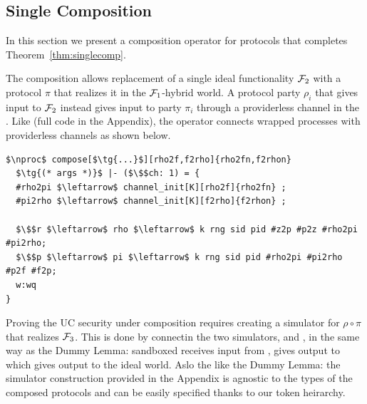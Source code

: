\subsection{Single Composition}
In this section we present a composition operator for protocols that completes Theorem~\ref{thm:singlecomp}.

The composition allows replacement of a single ideal functionality $\mathcal{F}_2$ with a protocol $\pi$ that realizes it in the $\mathcal{F}_1$-hybrid world. 
A protocol party $\rho_i$ that gives input to $\mathcal{F}_2$ instead gives input to party $\pi_i$ through a providerless channel in the \partywrapper. 
Like  (full code in the Appendix), the operator connects wrapped processes with providerless channels as shown below. 
\begin{lstlisting}[basicstyle=\footnotesize\BeraMonottFamily, mathescape, frame=single]
$\nproc$ compose[$\tg{...}$][rho2f,f2rho]{rho2fn,f2rhon}
  $\tg{(* args *)}$ |- ($\$$ch: 1) = {
  #rho2pi $\leftarrow$ channel_init[K][rho2f]{rho2fn} ;
  #pi2rho $\leftarrow$ channel_init[K][f2rho]{f2rhon} ;
  
  $\$$r $\leftarrow$ rho $\leftarrow$ k rng sid pid #z2p #p2z #rho2pi #pi2rho; 
  $\$$p $\leftarrow$ pi $\leftarrow$ k rng sid pid #rho2pi #pi2rho #p2f #f2p;
  w:wq
}
\end{lstlisting}

Proving the UC security under composition requires creating a simulator for $\rho \circ \pi$ that realizes $\mathcal{F}_3$. This is done by connectin the two simulators, \SIM{\pi} and \SIM{\rho}, in the same way as the Dummy Lemma: sandboxed \SIM{\pi} receives input from \Z, gives output to \SIM{\rho} which gives output to the ideal world.  
Aslo the like the Dummy Lemma: the simulator construction provided in the Appendix is agnostic to the types of the composed protocols and can be easily specified thanks to our token heirarchy. 

